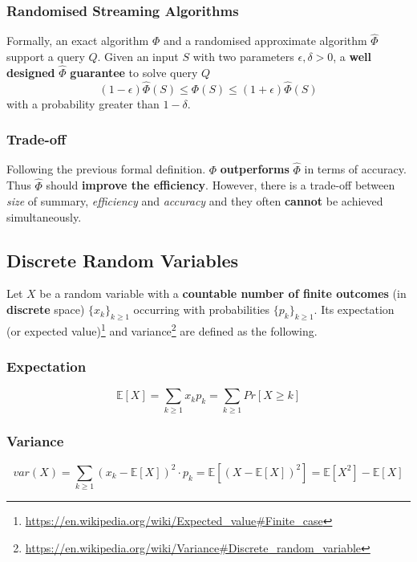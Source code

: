 \documentclass[a4paper]{article}
\newcommand{\Expected}[1]{\mathbb{E}[#1]}
\begin{document}
\subsubsection{Randomised Streaming Algorithms}

Formally, an exact algorithm $\Phi$ and a randomised approximate algorithm $\hat{\Phi}$ support a query $Q$. Given an input $S$ with two parameters $\epsilon,\delta > 0$, a \textbf{well designed} $\hat{\Phi}$ \textbf{guarantee} to solve query $Q$
$$(1-\epsilon)\hat{\Phi}(S) \leq \Phi(S) \leq (1+\epsilon)\hat{\Phi}(S)$$
with a probability greater than $1-\delta$.

\subsubsection{Trade-off}

Following the previous formal definition. $\Phi$ \textbf{outperforms} $\hat{\Phi}$ in terms of accuracy. Thus $\hat{\Phi}$ should \textbf{improve the efficiency}. However, there is a trade-off between \textit{size} of summary, \textit{efficiency} and \textit{accuracy} and they often \textbf{cannot} be achieved simultaneously.

\subsection{Discrete Random Variables}

Let $X$ be a random variable with a \textbf{countable number of finite outcomes} (in \textbf{discrete} space) $\{x_k\}_{k \geq 1}$ occurring with probabilities $\{p_k\}_{k \geq 1}$. Its expectation (or expected value)\footnote{\url{https://en.wikipedia.org/wiki/Expected_value\#Finite_case}} and variance\footnote{\url{https://en.wikipedia.org/wiki/Variance\#Discrete_random_variable}} are defined as the following.

\subsubsection{Expectation}

$$\Expected{X} = \sum_{k \geq 1}x_k p_k = \sum_{k \geq 1}Pr[X \geq k]$$

\subsubsection{Variance}

$$var(X) = \sum_{k \geq 1}(x_k - \Expected{X})^2 \cdot p_k = \Expected{(X-\Expected{X})^2} = \Expected{X^2}-\Expected{X}$$
\end{document}
